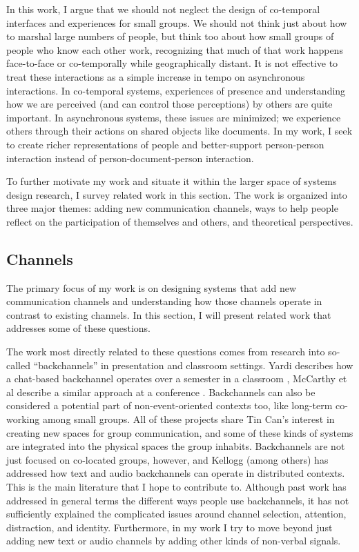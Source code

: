 \documentclass{tufte-handout}
\begin{document}
In this work, I argue that we should not neglect the design of co-temporal interfaces and experiences for small groups. We should not think just about how to marshal large numbers of people, but think too about how small groups of people who know each other work, recognizing that much of that work happens face-to-face or co-temporally while geographically distant. It is not effective to treat these interactions as a simple increase in tempo on asynchronous interactions. In co-temporal systems, experiences of presence and understanding how we are perceived (and can control those perceptions) by others are quite important. In asynchronous systems, these issues are minimized; we experience others through their actions on shared objects like documents. In my work, I seek to create richer representations of people and better-support person-person interaction instead of person-document-person interaction. 

To further motivate my work and situate it within the larger space of systems design research, I survey related work in this section. The work is organized into three major themes: adding new communication channels, ways to help people reflect on the participation of themselves and others, and theoretical perspectives.


\subsection{Channels}

The primary focus of my work is on designing systems that add new communication channels and understanding how those channels operate in contrast to existing channels. In this section, I will present related work that addresses some of these questions.

The work most directly related to these questions comes from research into so-called ``backchannels'' in presentation and classroom settings. Yardi describes how a chat-based backchannel operates over a semester in a classroom \cite{Yardi:2006uk}, McCarthy et al describe a similar approach at a conference \cite{mccarthy_digital_2004}. Backchannels can also be considered a potential part of non-event-oriented contexts too, like long-term co-working among small groups. \cite{Huang:2003ef} All of these projects share Tin Can's interest in creating new spaces for group communication, and some of these kinds of systems are integrated into the physical spaces the group inhabits. Backchannels are not just focused on co-located groups, however, and Kellogg (among others) \cite{kellogg_leveraging_2006} \cite{Yankelovich:2005bx} has addressed how text and audio backchannels can operate in distributed contexts. This is the main literature that I hope to contribute to. Although past work has addressed in general terms the different ways people use backchannels, it has not sufficiently explained the complicated issues around channel selection, attention, distraction, and identity. Furthermore, in my work I try to move beyond just adding new text or audio channels by adding other kinds of non-verbal signals.
\end{document}
